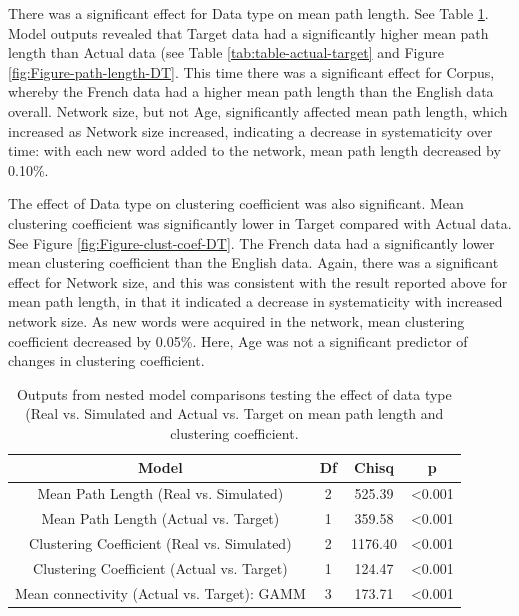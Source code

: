 \documentclass[
  man]{apa6}
\begin{document}
There was a significant effect for Data type on mean path length. See Table \ref{tab:table-model-output}. Model outputs revealed that Target data had a significantly higher mean path length than Actual data (see Table \ref{tab:table-actual-target} and Figure \ref{fig:Figure-path-length-DT}. This time there was a significant effect for Corpus, whereby the French data had a higher mean path length than the English data overall. Network size, but not Age, significantly affected mean path length, which increased as Network size increased, indicating a decrease in systematicity over time: with each new word added to the network, mean path length decreased by 0.10\%.

The effect of Data type on clustering coefficient was also significant. Mean clustering coefficient was significantly lower in Target compared with Actual data. See Figure \ref{fig:Figure-clust-coef-DT}. The French data had a significantly lower mean clustering coefficient than the English data. Again, there was a significant effect for Network size, and this was consistent with the result reported above for mean path length, in that it indicated a decrease in systematicity with increased network size. As new words were acquired in the network, mean clustering coefficient decreased by 0.05\%. Here, Age was not a significant predictor of changes in clustering coefficient.

\begin{longtable}[t]{cccc}
\caption{\label{tab:table-model-output}Outputs from nested model comparisons testing the effect of data type (Real vs. Simulated and Actual vs. Target on mean path length and clustering coefficient.}\\
\toprule
Model & Df & Chisq & p\\
\midrule
Mean Path Length (Real vs. Simulated) & 2 & 525.39 & <0.001\\
Mean Path Length (Actual vs. Target) & 1 & 359.58 & <0.001\\
Clustering Coefficient (Real vs. Simulated) & 2 & 1176.40 & <0.001\\
Clustering Coefficient (Actual vs. Target) & 1 & 124.47 & <0.001\\
Mean connectivity (Actual vs. Target): GAMM & 3 & 173.71 & <0.001\\
\bottomrule
\end{longtable}
\end{document}
